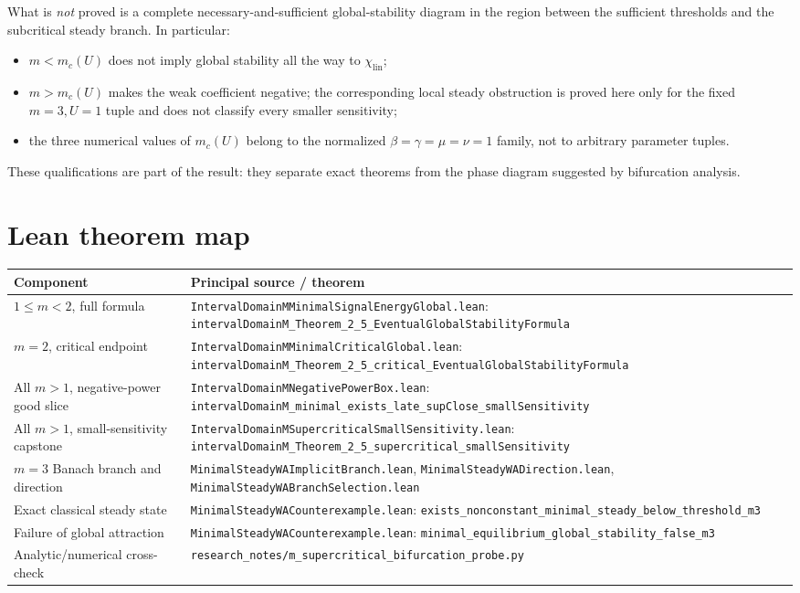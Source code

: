 \documentclass[11pt]{article}
\newcommand{\code}[1]{\nolinkurl{#1}}
\begin{document}
\noindent What is \emph{not} proved is a complete necessary-and-sufficient
global-stability diagram in the region between the sufficient thresholds and
the subcritical steady branch.  In particular:
\begin{itemize}[leftmargin=2em]
\item \(m<m_c(U)\) does not imply global stability all the way to
  \(\chi_{\mathrm{lin}}\);
\item \(m>m_c(U)\) makes the weak coefficient negative; the corresponding
  local steady obstruction is proved here only for the fixed \(m=3,U=1\)
  tuple and does not classify every smaller sensitivity;
\item the three numerical values of \(m_c(U)\) belong to the normalized
  \(\beta=\gamma=\mu=\nu=1\) family, not to arbitrary parameter tuples.
\end{itemize}
These qualifications are part of the result: they separate exact theorems
from the phase diagram suggested by bifurcation analysis.

\section{Lean theorem map}

\begin{center}
\small
\renewcommand{\arraystretch}{1.18}
\begin{tabular}{@{}p{}p{}@{}}
\toprule
Component & Principal source / theorem\\
\midrule
\(1\le m<2\), full formula &
\code{IntervalDomainMMinimalSignalEnergyGlobal.lean}:
\code{intervalDomainM_Theorem_2_5_EventualGlobalStabilityFormula}\\
\(m=2\), critical endpoint &
\code{IntervalDomainMMinimalCriticalGlobal.lean}:
\code{intervalDomainM_Theorem_2_5_critical_EventualGlobalStabilityFormula}\\
All \(m>1\), negative-power good slice &
\code{IntervalDomainMNegativePowerBox.lean}:
\code{intervalDomainM_minimal_exists_late_supClose_smallSensitivity}\\
All \(m>1\), small-sensitivity capstone &
\code{IntervalDomainMSupercriticalSmallSensitivity.lean}:
\code{intervalDomainM_Theorem_2_5_supercritical_smallSensitivity}\\
\(m=3\) Banach branch and direction &
\code{MinimalSteadyWAImplicitBranch.lean},
\code{MinimalSteadyWADirection.lean},
\code{MinimalSteadyWABranchSelection.lean}\\
Exact classical steady state &
\code{MinimalSteadyWACounterexample.lean}:
\code{exists_nonconstant_minimal_steady_below_threshold_m3}\\
Failure of global attraction &
\code{MinimalSteadyWACounterexample.lean}:
\code{minimal_equilibrium_global_stability_false_m3}\\
Analytic/numerical cross-check &
\code{research_notes/m_supercritical_bifurcation_probe.py}\\
\bottomrule
\end{tabular}
\end{center}
\end{document}
